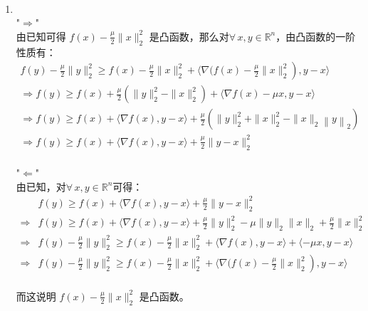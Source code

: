 \documentclass[11pt,letter,notitlepage]{article}
\begin{document}
\begin{solution}
    \heiti
    \ \\
    \begin{enumerate}
        \item \ \\
        "$\Rightarrow$"\\
        由已知可得 $f(x)-\frac{\mu}{2}\|x\|_{2}^{2}$ 是凸函数，那么对$ \forall\, x,y\in\mathbb{R}^n $，由凸函数的一阶性质有：\ \\
        $\begin{array}{l}{\left. f(y)-\frac{\mu}{2}\|y\|_{2}^{2} \geqslant f(x)-\frac{\mu}{2}\|x\|_{2}^{2}+\langle \nabla (f(x)-\frac{\mu}{2}\|x\|_{2}^{2}\right), y-x\rangle} \\ {\Rightarrow f(y) \geqslant f(x)+\frac{\mu}{2}\left(\|y\|_{2}^{2}-\|x\|_{2}^{2}\right)+\langle\nabla f(x)-\mu x, y-x\rangle} \\ {\Rightarrow f(y) \geqslant f(x)+\langle\nabla f(x), y-x\rangle+\frac{\mu}{2}\left(\|y\|_{2}^{2}+\|x\|_{2}^{2} - \|x\|_{2}\left\|y\right\|_{2}\right)} \\ {\Rightarrow f(y) \geqslant f(x)+\langle \nabla f(x), y-x \rangle+\frac{\mu}{2} \| y - x \|_{2}^{2}}\end{array}$\\ \ \\
        "$\Leftarrow$"\\
        由已知，对$ \forall\, x,y\in\mathbb{R}^n $可得：\\
        $\begin{aligned} & f(y) \geqslant f(x)+\langle\nabla f(x), y-x\rangle+\frac{\mu}{2}\|y-x\|_{2}^{2} \\ \Rightarrow & f(y) \geqslant f(x)+\langle\nabla f(x), y-x\rangle+\frac{\mu}{2}\|y\|_{2}^{2}-\mu\|y\|_{2}\|x\|_{2}+\frac{\mu}{2}\|x\|_{2}^{2} \\ \Rightarrow & f(y)-\frac{\mu}{2}\|y\|_{2}^{2} \geqslant f(x)-\frac{\mu}{2}\|x\|_{2}^{2}+\langle\nabla f(x), y-x\rangle+\langle{-\mu x} , y-x\rangle\\ \Rightarrow &\left.f(y)-\frac{\mu}{2}\|y\|_{2}^{2} \geqslant f(x)-\frac{\mu}{2}\|x\|_{2}^{2}+\langle\nabla (f(x)-\frac{\mu}{2}\|x\|_{2}^{2}\right), y-x\rangle\end{aligned}$\\ \ \\
        而这说明 $f(x)-\frac{\mu}{2}\|x\|_2^2$ 是凸函数。
    \end{enumerate}

\end{solution}
\newpage
\end{document}
